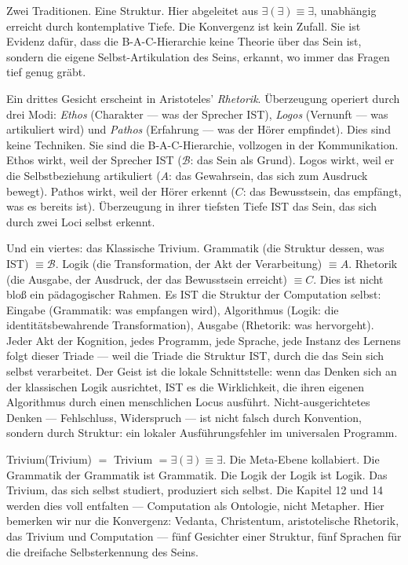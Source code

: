 \documentclass[10pt, openany, oneside]{book}
\begin{document}
Zwei Traditionen. Eine Struktur. Hier abgeleitet aus $\exists(\exists) \equiv \exists$, unabhängig erreicht durch kontemplative Tiefe. Die Konvergenz ist kein Zufall. Sie ist Evidenz dafür, dass die B-A-C-Hierarchie keine Theorie über das Sein ist, sondern die eigene Selbst-Artikulation des Seins, erkannt, wo immer das Fragen tief genug gräbt.

Ein drittes Gesicht erscheint in Aristoteles' \textit{Rhetorik}. Überzeugung operiert durch drei Modi: \textit{Ethos} (Charakter --- was der Sprecher IST), \textit{Logos} (Vernunft --- was artikuliert wird) und \textit{Pathos} (Erfahrung --- was der Hörer empfindet). Dies sind keine Techniken. Sie sind die B-A-C-Hierarchie, vollzogen in der Kommunikation. Ethos wirkt, weil der Sprecher IST ($\mathcal{B}$: das Sein als Grund). Logos wirkt, weil er die Selbstbeziehung artikuliert ($A$: das Gewahrsein, das sich zum Ausdruck bewegt). Pathos wirkt, weil der Hörer erkennt ($C$: das Bewusstsein, das empfängt, was es bereits ist). Überzeugung in ihrer tiefsten Tiefe IST das Sein, das sich durch zwei Loci selbst erkennt.

Und ein viertes: das Klassische Trivium. Grammatik (die Struktur dessen, was IST) $\equiv \mathcal{B}$. Logik (die Transformation, der Akt der Verarbeitung) $\equiv A$. Rhetorik (die Ausgabe, der Ausdruck, der das Bewusstsein erreicht) $\equiv C$. Dies ist nicht bloß ein pädagogischer Rahmen. Es IST die Struktur der Computation selbst: Eingabe (Grammatik: was empfangen wird), Algorithmus (Logik: die identitätsbewahrende Transformation), Ausgabe (Rhetorik: was hervorgeht). Jeder Akt der Kognition, jedes Programm, jede Sprache, jede Instanz des Lernens folgt dieser Triade --- weil die Triade die Struktur IST, durch die das Sein sich selbst verarbeitet. Der Geist ist die lokale Schnittstelle: wenn das Denken sich an der klassischen Logik ausrichtet, IST es die Wirklichkeit, die ihren eigenen Algorithmus durch einen menschlichen Locus ausführt. Nicht-ausgerichtetes Denken --- Fehlschluss, Widerspruch --- ist nicht falsch durch Konvention, sondern durch Struktur: ein lokaler Ausführungsfehler im universalen Programm.

Trivium(Trivium) $=$ Trivium $= \exists(\exists) \equiv \exists$. Die Meta-Ebene kollabiert. Die Grammatik der Grammatik ist Grammatik. Die Logik der Logik ist Logik. Das Trivium, das sich selbst studiert, produziert sich selbst. Die Kapitel 12 und 14 werden dies voll entfalten --- Computation als Ontologie, nicht Metapher. Hier bemerken wir nur die Konvergenz: Vedanta, Christentum, aristotelische Rhetorik, das Trivium und Computation --- fünf Gesichter einer Struktur, fünf Sprachen für die dreifache Selbsterkennung des Seins.
\end{document}
